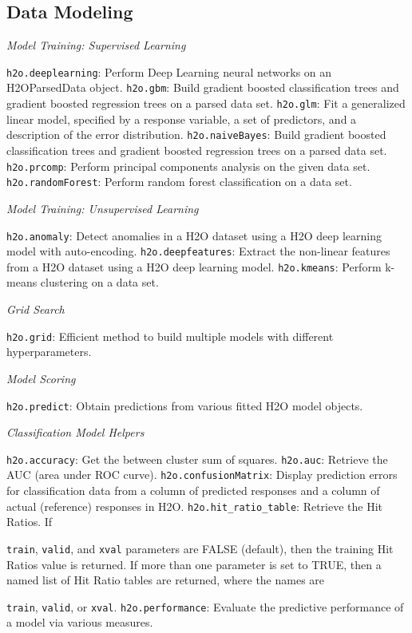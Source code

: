 {{{\subsection{Data Modeling}

\medskip
\emph{Model Training: Supervised Learning}\par
{\texttt{h2o.deeplearning}}: Perform Deep Learning neural networks on an\\ H2OParsedData object. 
{\texttt{h2o.gbm}}: Build gradient boosted classification trees and gradient boosted regression trees on a parsed data set.  
{\texttt{h2o.glm}}: Fit a generalized linear model, specified by a response variable, a set of predictors, and a description of the error distribution.  
{\texttt{h2o.naiveBayes}}: Build gradient boosted classification trees and gradient boosted regression trees on a parsed data set. 
{\texttt{h2o.prcomp}}: Perform principal components analysis on the given data set.  
{\texttt{h2o.randomForest}}: Perform random forest classification on a data set. 

\medskip
\emph{Model Training: Unsupervised Learning}\par
{\texttt{h2o.anomaly}}: Detect anomalies in a H2O dataset using a H2O deep learning model with auto-encoding. 
{\texttt{h2o.deepfeatures}}: Extract the non-linear features from a H2O dataset using a H2O deep learning model. 
{\texttt{h2o.kmeans}}: Perform k-means clustering on a data set.  

\medskip
\emph{Grid Search}\par
{\texttt{h2o.grid}}: Efficient method to build multiple models with different hyperparameters.  

\medskip
\emph{Model Scoring}\par
{\texttt{h2o.predict}}: Obtain predictions from various fitted H2O model objects. 

\medskip
\emph{Classification Model Helpers}\par
{\texttt{h2o.accuracy}}: Get the between cluster sum of squares. 
{\texttt{h2o.auc}}: Retrieve the AUC (area under ROC curve). 
{\texttt{h2o.confusionMatrix}}: Display prediction errors for classification data from a column of predicted responses and a column of actual (reference) responses in H2O. 
{\texttt{h2o.hit\_ratio\_table}}: Retrieve the Hit Ratios. If {\texttt{train}, {\texttt{valid}}, and {\texttt{xval}} parameters are FALSE (default), then the training Hit Ratios value is returned. If more than one parameter is set to TRUE, then a named list
of Hit Ratio tables are returned, where the names are {\texttt{train}, {\texttt{valid}}, or {\texttt{xval}}. 
{\texttt{h2o.performance}}: Evaluate the predictive performance of a model via various measures. 

}}}}}
